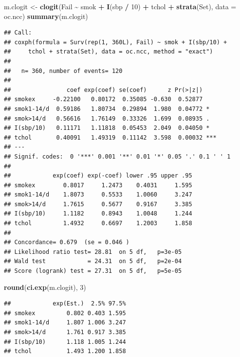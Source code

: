 \documentclass[
]{book}
\newenvironment{Shaded}{\begin{snugshade}}{\end{snugshade}}
\newcommand{\AttributeTok}[1]{\textcolor[rgb]{0.13,0.29,0.53}{#1}}
\newcommand{\DecValTok}[1]{\textcolor[rgb]{0.00,0.00,0.81}{#1}}
\newcommand{\FunctionTok}[1]{\textcolor[rgb]{0.13,0.29,0.53}{\textbf{#1}}}
\newcommand{\NormalTok}[1]{#1}
\newcommand{\OtherTok}[1]{\textcolor[rgb]{0.56,0.35,0.01}{#1}}
\newcommand{\SpecialCharTok}[1]{\textcolor[rgb]{0.81,0.36,0.00}{\textbf{#1}}}
\theoremstyle{definition}
\theoremstyle{definition}
\theoremstyle{definition}
\theoremstyle{definition}
\theoremstyle{remark}
\begin{document}
\begin{Shaded}
\begin{Highlighting}[]
\NormalTok{m.clogit }\OtherTok{\textless{}{-}} \FunctionTok{clogit}\NormalTok{(Fail }\SpecialCharTok{\textasciitilde{}}\NormalTok{ smok }\SpecialCharTok{+} \FunctionTok{I}\NormalTok{(sbp }\SpecialCharTok{/} \DecValTok{10}\NormalTok{) }\SpecialCharTok{+}\NormalTok{ tchol }\SpecialCharTok{+}
  \FunctionTok{strata}\NormalTok{(Set), }\AttributeTok{data =}\NormalTok{ oc.ncc)}
\FunctionTok{summary}\NormalTok{(m.clogit)}
\end{Highlighting}
\end{Shaded}

\begin{verbatim}
## Call:
## coxph(formula = Surv(rep(1, 360L), Fail) ~ smok + I(sbp/10) + 
##     tchol + strata(Set), data = oc.ncc, method = "exact")
## 
##   n= 360, number of events= 120 
## 
##                coef exp(coef) se(coef)      z Pr(>|z|)    
## smokex     -0.22100   0.80172  0.35085 -0.630  0.52877    
## smok1-14/d  0.59186   1.80734  0.29894  1.980  0.04772 *  
## smok>14/d   0.56616   1.76149  0.33326  1.699  0.08935 .  
## I(sbp/10)   0.11171   1.11818  0.05453  2.049  0.04050 *  
## tchol       0.40091   1.49319  0.11142  3.598  0.00032 ***
## ---
## Signif. codes:  0 '***' 0.001 '**' 0.01 '*' 0.05 '.' 0.1 ' ' 1
## 
##            exp(coef) exp(-coef) lower .95 upper .95
## smokex        0.8017     1.2473    0.4031     1.595
## smok1-14/d    1.8073     0.5533    1.0060     3.247
## smok>14/d     1.7615     0.5677    0.9167     3.385
## I(sbp/10)     1.1182     0.8943    1.0048     1.244
## tchol         1.4932     0.6697    1.2003     1.858
## 
## Concordance= 0.679  (se = 0.046 )
## Likelihood ratio test= 28.81  on 5 df,   p=3e-05
## Wald test            = 24.31  on 5 df,   p=2e-04
## Score (logrank) test = 27.31  on 5 df,   p=5e-05
\end{verbatim}

\begin{Shaded}
\begin{Highlighting}[]
\FunctionTok{round}\NormalTok{(}\FunctionTok{ci.exp}\NormalTok{(m.clogit), }\DecValTok{3}\NormalTok{)}
\end{Highlighting}
\end{Shaded}

\begin{verbatim}
##            exp(Est.)  2.5% 97.5%
## smokex         0.802 0.403 1.595
## smok1-14/d     1.807 1.006 3.247
## smok>14/d      1.761 0.917 3.385
## I(sbp/10)      1.118 1.005 1.244
## tchol          1.493 1.200 1.858
\end{verbatim}
\end{document}
